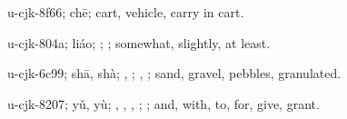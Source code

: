 \begin{multicols}{2}
{\cjkgGlue{}u-cjk-8f66; chē; cart, vehicle, carry in cart.

\cjkgGlue{}u-cjk-804a; liáo; \cjkgGlue{}; \cjkgGlue{}; somewhat, slightly, at least.

\cjkgGlue{}u-cjk-6c99; shā, shà; \cjkgGlue{}, \cjkgGlue{}; \cjkgGlue{}, \cjkgGlue{}; sand, gravel, pebbles, granulated.

\cjkgGlue{}u-cjk-8207; yǔ, yù; \cjkgGlue{}\cjkgGlue{}\cjkgGlue{}, \cjkgGlue{}\cjkgGlue{}\cjkgGlue{}, \cjkgGlue{}\cjkgGlue{}\cjkgGlue{}, \cjkgGlue{}; \cjkgGlue{}; and, with, to, for, give, grant.

}



\end{multicols}




